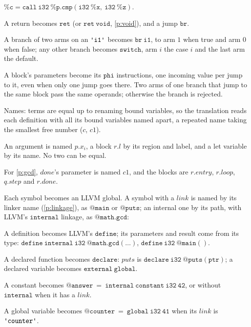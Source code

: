 \documentclass[11pt,letterpaper]{article}
\newcommand{\kw}[1]{\mathtt{#1}}
\newcommand{\str}[1]{\text{\ttfamily\textquotesingle #1\textquotesingle}}  %
\newcounter{pt}
\newcommand{\pref}[1]{\ref{#1}}  %
\begin{document}
\begin{points}
\begin{subpoints}
    $\kw{\%c = call\ i32\ \%p.cmp(i32\ \%x,\ i32\ \%z)}$.
  \item A return becomes $\kw{ret}$ (or $\kw{ret\ void}$, \pref{p:void}), and a jump $\kw{br}$.
  \item A branch of two arms on an $\str{i1}$ becomes $\kw{br\ i1}$, to arm $1$ when true and arm $0$ when false;
    any other branch becomes $\kw{switch}$, arm $i$ the case $i$ and the last arm the default.
  \item A block's parameters become its $\kw{phi}$ instructions, one incoming value per jump to it, even
    when only one jump goes there. Two arms of one branch that jump to the same block pass the same
    operands; otherwise the branch is rejected.
  \end{subpoints}
\item\label{p:names} Names: terms are equal up to renaming bound variables, so the translation reads
  each definition with all its bound variables named apart, a repeated name taking the smallest free
  number ($c$, $c1$).
  \begin{subpoints}
  \item An argument is named $p.x_i$, a block $r.l$ by its region and label, and a let variable by its name.
    No two can be equal.
  \item For \pref{p:gcd}, $\mathit{done}$'s parameter is named $c1$, and the blocks are $r.\mathit{entry}$,
    $r.\mathit{loop}$, $q.\mathit{step}$ and $r.\mathit{done}$.
  \end{subpoints}
\item\label{p:symbols-llvm} Each symbol becomes an LLVM global. A symbol with a $\mathit{link}$ is named by its
  linker name (\pref{p:linkage}), as $\kw{@main}$ or $\kw{@puts}$; an internal one by its path, with LLVM's
  $\kw{internal}$ linkage, as $\kw{@math.gcd}$:
  \begin{subpoints}
  \item A definition becomes LLVM's $\kw{define}$; its parameters and result come from its type:
    $\kw{define\ internal\ i32\ @math.gcd(\dots)}$, $\kw{define\ i32\ @main()}$.
  \item A declared function becomes $\kw{declare}$: $\mathit{puts}$ is
    $\kw{declare\ i32\ @puts(ptr)}$; a declared variable becomes $\kw{external\ global}$.
  \item A constant becomes $\kw{@answer\ =\ internal\ constant\ i32\ 42}$, or without $\kw{internal}$ when it has a $\mathit{link}$.
  \item A global variable becomes $\kw{@counter\ =\ global\ i32\ 41}$ when its $\mathit{link}$ is $\str{counter}$.

\end{subpoints}
\end{points}
\end{document}
